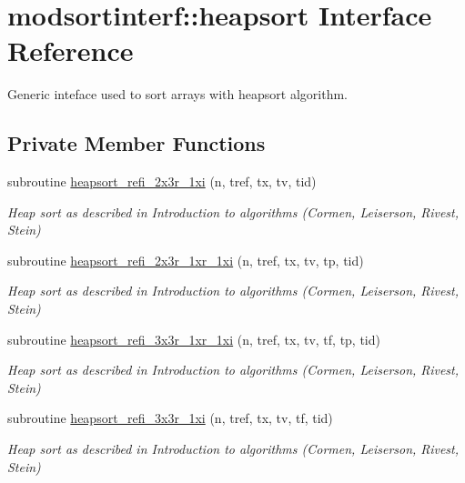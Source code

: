 \hypertarget{interfacemodsortinterf_1_1heapsort}{\section{modsortinterf\-:\-:heapsort Interface Reference}
\label{interfacemodsortinterf_1_1heapsort}
}


Generic inteface used to sort arrays with heapsort algorithm.  


\subsection*{Private Member Functions}
\begin{DoxyCompactItemize}
\item 
subroutine \hyperlink{interfacemodsortinterf_1_1heapsort_a5cbbb5add647e60a3338d4d5aa5bc0c4}{heapsort\-\_\-refi\-\_\-2x3r\-\_\-1xi} (n, tref, tx, tv, tid)
\begin{DoxyCompactList}\small\item\em Heap sort as described in Introduction to algorithms (Cormen, Leiserson, Rivest, Stein) \end{DoxyCompactList}\item 
subroutine \hyperlink{interfacemodsortinterf_1_1heapsort_acf802a187b3156217c5189914fc3c5dc}{heapsort\-\_\-refi\-\_\-2x3r\-\_\-1xr\-\_\-1xi} (n, tref, tx, tv, tp, tid)
\begin{DoxyCompactList}\small\item\em Heap sort as described in Introduction to algorithms (Cormen, Leiserson, Rivest, Stein) \end{DoxyCompactList}\item 
subroutine \hyperlink{interfacemodsortinterf_1_1heapsort_a1b0496cffffd026ecd963c6c940f74c1}{heapsort\-\_\-refi\-\_\-3x3r\-\_\-1xr\-\_\-1xi} (n, tref, tx, tv, tf, tp, tid)
\begin{DoxyCompactList}\small\item\em Heap sort as described in Introduction to algorithms (Cormen, Leiserson, Rivest, Stein) \end{DoxyCompactList}\item 
subroutine \hyperlink{interfacemodsortinterf_1_1heapsort_a0ba1556a756726e4b7f9339970f089b1}{heapsort\-\_\-refi\-\_\-3x3r\-\_\-1xi} (n, tref, tx, tv, tf, tid)
\begin{DoxyCompactList}\small\item\em Heap sort as described in Introduction to algorithms (Cormen, Leiserson, Rivest, Stein) \end{DoxyCompactList}\item 

\end{DoxyCompactItemize}
